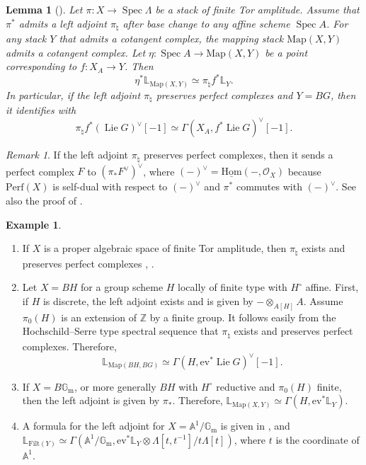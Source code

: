 \documentclass{amsart}
\newtheorem{lemma}[theorem]{Lemma}
\theoremstyle{definition}
\newtheorem{example}[theorem]{Example}
\theoremstyle{remark}
\newtheorem{remark}[theorem]{Remark}
\numberwithin{equation}{section}
\DeclareMathOperator{\Lie}{Lie}
\DeclareMathOperator{\Spec}{Spec}
\newcommand{\mc}{\mathcal}
\newcommand{\bb}{\mathbb}
\newcommand{\Z}{\mathbb{Z}}
\newcommand{\Gm}{{\mathbb{G}_{\mathrm{m}}}}
\newcommand{\Hom}{\mathrm{Hom}}
\newcommand{\Perf}{\mathrm{Perf}}
\newcommand{\Map}{\mathrm{Map}}
\newcommand{\ev}{\mathrm{ev}}
\begin{document}
\begin{lemma}[{\cite[Proposition 5.1.10]{HalpernLeistnerPreygel}}]\label{lem: MappingStackCotangentComplex}
Let $\pi\colon X\to \Spec \Lambda$ be a stack of finite Tor amplitude. Assume that $\pi^*$ admits a left adjoint $\pi_{\natural}$ after base change to any affine scheme $\Spec A$. For any stack $Y$ that admits a cotangent complex, the mapping stack $\Map(X, Y)$ admits a cotangent complex. Let $\eta\colon \Spec A \to \Map(X,Y)$ be a point corresponding to $f\colon X_A\to Y$. Then
\[
\eta^*\bb L_{\Map(X, Y)}\simeq \pi_\natural f^* \bb L_{Y}.
\]
In particular, if the left adjoint $\pi_\natural$ preserves perfect complexes and $Y=BG$, then it identifies with
\[
\pi_\natural f^* (\Lie G)^\vee[-1] \simeq \Gamma (X_A, f^* \Lie G)^{\vee}[-1]. 
\]
\end{lemma}

\begin{remark}\label{rem: LeftAdjointOfPullBack}
If the left adjoint $\pi_\natural$ preserves perfect complexes, then it sends a perfect complex $F$ to $(\pi_* F^\vee)^\vee$, where $(-)^\vee =\underline{\Hom}(-, \mc O_X)$ because $\Perf(X)$ is self-dual with respect to $(-)^{\vee}$ and $\pi^*$ commutes with $(-)^{\vee}$. See also the proof of \cite[Proposition 8.12]{ScholzeSixFunctor}.  
\end{remark}

\begin{example}\label{ex: GroupHomologyExample}
\begin{enumerate}
\item If $X$ is a proper algebraic space of finite Tor amplitude, then $\pi_\natural$ exists and preserves perfect complexes \cite[Theorem 8.10]{ScholzeSixFunctor}, \cite[Proposition 9.7]{ZhuTame}. 
\item Let $X=BH$ for a group scheme $H$ locally of finite type with $H^\circ$ affine. First, if $H$ is discrete, the left adjoint exists and is given by $-\otimes_{A[H]}A$. Assume $\pi_0(H)$ is an extension of $\Z$ by a finite group. It follows easily from the Hochschild--Serre type spectral sequence that $\pi_\natural$ exists and preserves perfect complexes. Therefore, 
\[
\bb L_{\Map (BH, BG)} \simeq \Gamma (H, \ev^* \Lie G)^{\vee}[-1].
\] 
\item If $X=B\Gm$, or more generally $BH$ with $H^{\circ}$ reductive and $\pi_0(H)$ finite, then the left adjoint is given by $\pi_*$. Therefore, $\bb L_{\Map(X, Y)}\simeq \Gamma (H, \ev^*\bb L_Y)$. 
\item A formula for the left adjoint for $X=\bb A^1/\Gm$ is given in \cite[Lemma 1.3.1]{HalpernLeistner}, and $\bb L_{\mathrm{Filt}(Y)}\simeq \Gamma (\bb A^1/\Gm, \ev^*\bb L_{Y}\otimes \Lambda [t, t^{-1}]/t\Lambda [t])$, where $t$ is the coordinate of $\bb A^1$. 
\end{enumerate}
\end{example}
\end{document}
